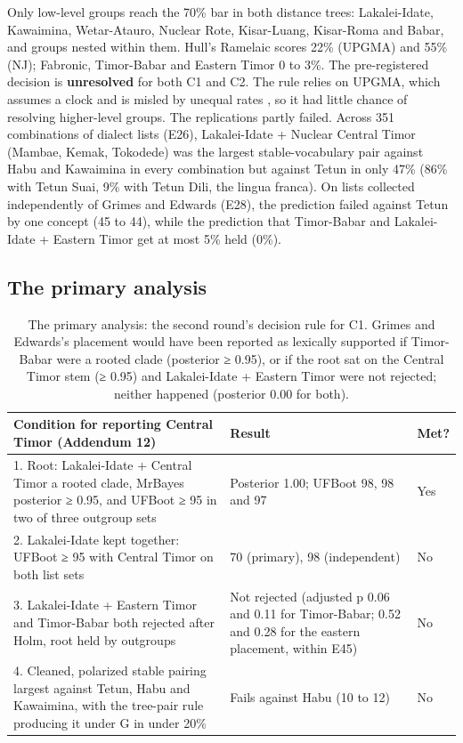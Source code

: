 \documentclass[11pt]{article}
\newcommand{\hd}[1]{\begin{minipage}[b]{\linewidth}\raggedright #1\end{minipage}}
\begin{document}
Only low-level groups reach the 70\% bar in both distance trees: Lakalei-Idate, Kawaimina, Wetar-Atauro, Nuclear Rote, Kisar-Luang, Kisar-Roma and Babar, and groups nested within them. Hull's Ramelaic scores 22\% (UPGMA) and 55\% (NJ); Fabronic, Timor-Babar and Eastern Timor 0 to 3\%. The pre-registered decision is \textbf{unresolved} for both C1 and C2. The rule relies on UPGMA, which assumes a clock and is misled by unequal rates \citep{blust2000}, so it had little chance of resolving higher-level groups. The replications partly failed. Across 351 combinations of dialect lists (E26), Lakalei-Idate + Nuclear Central Timor (Mambae, Kemak, Tokodede) was the largest stable-vocabulary pair against Habu and Kawaimina in every combination but against Tetun in only 47\% (86\% with Tetun Suai, 9\% with Tetun Dili, the lingua franca). On lists collected independently of Grimes and Edwards (E28), the prediction failed against Tetun by one concept (45 to 44), while the prediction that Timor-Babar and Lakalei-Idate + Eastern Timor get at most 5\% held (0\%).

\subsection{The primary analysis}

\begin{table}[tbp]
\caption{The primary analysis: the second round's decision rule for C1.
Grimes and Edwards's placement would have been reported as lexically
supported if Timor-Babar were a rooted clade (posterior ≥ 0.95), or if
the root sat on the Central Timor stem (≥ 0.95) and Lakalei-Idate +
Eastern Timor were not rejected; neither happened (posterior 0.00 for
both).}
\label{tab:primary}
\begin{tabularx}{\linewidth}{@{}L{2.056}L{0.722}L{0.222}@{}}
\toprule
\hd{Condition for reporting Central Timor (Addendum 12)} & \hd{Result} & \hd{Met?} \\
. Root: Lakalei-Idate + Central Timor a rooted clade, MrBayes posterior ≥ 0.95, and UFBoot ≥ 95 in two of three outgroup sets & Posterior 1.00; UFBoot 98, 98 and 97 & Yes \\
2. Lakalei-Idate kept together: UFBoot ≥ 95 with Central Timor on both list sets & 70 (primary), 98 (independent) & No \\
3. Lakalei-Idate + Eastern Timor and Timor-Babar both rejected after Holm, root held by outgroups & Not rejected (adjusted p 0.06 and 0.11 for Timor-Babar; 0.52 and 0.28 for the eastern placement, within E45) & No \\
4. Cleaned, polarized stable pairing largest against Tetun, Habu and Kawaimina, with the tree-pair rule producing it under G in under 20\% & Fails against Habu (10 to 12) & No \\
\bottomrule
\end{tabularx}
\end{table}
\end{document}
